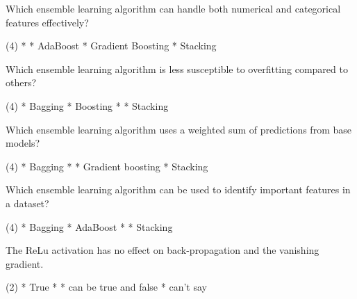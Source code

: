 \documentclass[11pt]{extarticle}
\begin{document}
\begin{exercise}
    Which ensemble learning algorithm can handle both numerical and categorical features effectively?
    \begin{choice} (4)
        * 
        * AdaBoost
        * Gradient Boosting
        * Stacking
    \end{choice}
\end{exercise}
\begin{solution}
\end{solution}

\begin{exercise}
    Which ensemble learning algorithm is less susceptible to overfitting compared to others?
    \begin{choice} (4)
        * Bagging
        * Boosting
        * 
        * Stacking
    \end{choice}
\end{exercise}
\begin{solution}
\end{solution}

\begin{exercise}
    Which ensemble learning algorithm uses a weighted sum of predictions from base models?
    \begin{choice} (4)
        * Bagging
        * 
        * Gradient boosting
        * Stacking
    \end{choice}
\end{exercise}
\begin{solution}
\end{solution}

\begin{exercise}
    Which ensemble learning algorithm can be used to identify important features in a dataset?
    \begin{choice} (4)
        * Bagging
        * AdaBoost
        * 
        * Stacking
    \end{choice}
\end{exercise}
\begin{solution}
\end{solution}

\begin{exercise}
    The ReLu activation has no effect on back-propagation and the vanishing gradient.
    \begin{choice} (2)
        * True
        * 
        * can be true and false
        * can't say
    \end{choice}
\end{exercise}
\begin{solution}
\end{solution}
\end{document}
